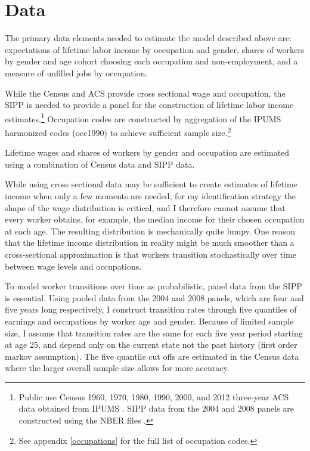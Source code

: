 \documentclass[12pt]{article}
\begin{document}

\section{Data} \label{data}
The primary data elements needed to estimate the model described above are: expectations of lifetime labor income by occupation and gender, shares of workers by gender and age cohort choosing each occupation and non-employment, and a measure of unfilled jobs by occupation.

While the Census and ACS provide cross sectional wage and occupation, the SIPP is needed to provide a panel for the construction of lifetime labor income estimates.\footnote{Public use Census 1960, 1970, 1980, 1990, 2000, and 2012 three-year ACS data obtained from IPUMS \cite{IPUMSUSA}. SIPP data from the 2004 and 2008 panels are constructed using the NBER files \cite{SIPP}. } Occupation codes are constructed by aggregation of the IPUMS harmonized codes (occ1990) to achieve sufficient sample size.\footnote{See appendix \ref{occupations} for the full list of occupation codes.}

Lifetime wages and shares of workers by gender and occupation are estimated using a combination of Census data and SIPP data.

 While using cross sectional data may be sufficient to create estimates of lifetime income when only a few moments are needed, for my identification strategy the shape of the wage distribution is critical, and I therefore cannot assume that every worker obtains, for example, the median income for their chosen occupation at each age. The resulting distribution is mechanically quite lumpy. One reason that the lifetime income distribution in reality might be much smoother than a cross-sectional approximation is that workers transition stochastically over time between wage levels and occupations.

To model worker transitions over time as probabilistic, panel data from the SIPP is essential. Using pooled data from the 2004 and 2008 panels, which are four and five years long respectively, I construct transition rates through five quantiles of earnings and occupations by worker age and gender. Because of limited sample size, I assume that transition rates are the same for each five year period starting at age 25, and depend only on the current state not the past history (first order markov assumption). The five quantile cut offs are estimated in the Census data where the larger overall sample size allows for more accuracy. 
\end{document}
